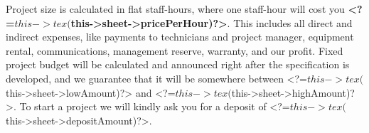 
Project size is calculated in flat staff-hours, where one staff-hour
will cost you \textbf{<?=$this->tex($this->sheet->pricePerHour)?>}. This includes
all direct and indirect expenses, like payments to technicians and project 
manager, equipment rental, communications, management reserve, warranty,
and our profit. Fixed project budget will be calculated and announced
right after the specification is developed, and we guarantee that it
will be somewhere between <?=$this->tex($this->sheet->lowAmount)?>
and <?=$this->tex($this->sheet->highAmount)?>.
To start a project we will kindly ask you for a deposit
of <?=$this->tex($this->sheet->depositAmount)?>.

